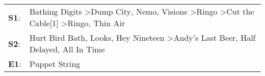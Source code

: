 \begin{supertabular}{p{0.03\textwidth}p{0.92\textwidth}}
 \textbf{S1}:  &  Bathing Digits\textsuperscript{} \textgreater \enspace Dump City\textsuperscript{}, \enspace Nemo\textsuperscript{}, \enspace Visions\textsuperscript{} \textgreater \enspace Ringo\textsuperscript{} \textgreater \enspace Cut the Cable[1]\textsuperscript{} \textgreater \enspace Ringo\textsuperscript{}, \enspace Thin Air\textsuperscript{}  \enspace  \\
 \textbf{S2}:  &                                                                                              Hurt Bird Bath\textsuperscript{}, \enspace Looks\textsuperscript{}, \enspace Hey Nineteen\textsuperscript{} \textgreater \enspace Andy's Last Beer\textsuperscript{}, \enspace Half Delayed\textsuperscript{}, \enspace All In Time\textsuperscript{}  \enspace  \\
 \textbf{E1}:  &                                                                                                                                                                                                                                                                                                                    Puppet String\textsuperscript{}  \enspace  \\
\end{supertabular}
